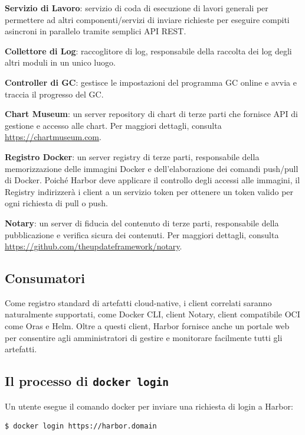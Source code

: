 \documentclass[12pt,a4paper]{report}
\begin{document}
\textbf{Servizio di Lavoro}: servizio di coda di esecuzione di lavori generali per permettere ad altri componenti/servizi di inviare richieste per eseguire compiti asincroni in parallelo tramite semplici API REST.

\textbf{Collettore di Log}: raccoglitore di log, responsabile della raccolta dei log degli altri moduli in un unico luogo.

\textbf{Controller di GC}: gestisce le impostazioni del programma GC online e avvia e traccia il progresso del GC.

\textbf{Chart Museum}: un server repository di chart di terze parti che fornisce API di gestione e accesso alle chart. Per maggiori dettagli, consulta \url{https://chartmuseum.com}.

\textbf{Registro Docker}: un server registry di terze parti, responsabile della memorizzazione delle immagini Docker e dell'elaborazione dei comandi push/pull di Docker. Poiché Harbor deve applicare il controllo degli accessi alle immagini, il Registry indirizzerà i client a un servizio token per ottenere un token valido per ogni richiesta di pull o push.

\textbf{Notary}: un server di fiducia del contenuto di terze parti, responsabile della pubblicazione e verifica sicura dei contenuti. Per maggiori dettagli, consulta \url{https://github.com/theupdateframework/notary}.

\subsection{Consumatori}
Come registro standard di artefatti cloud-native, i client correlati saranno naturalmente supportati, come Docker CLI, client Notary, client compatibile OCI come Oras e Helm. Oltre a questi client, Harbor fornisce anche un portale web per consentire agli amministratori di gestire e monitorare facilmente tutti gli artefatti.

\subsection{Il processo di \texttt{docker login}}
Un utente esegue il comando docker per inviare una richiesta di login a Harbor:
\begin{verbatim}
$ docker login https://harbor.domain
\end{verbatim}
\end{document}
